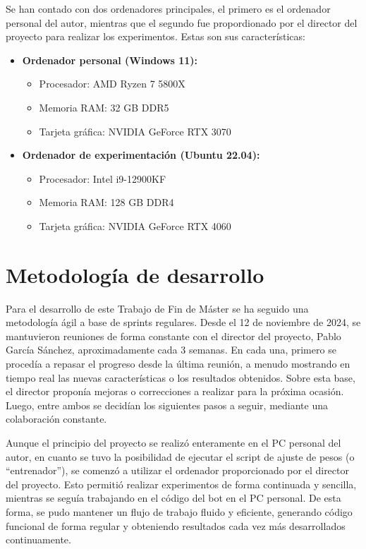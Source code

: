 Se han contado con dos ordenadores principales, el primero es el ordenador personal del autor, mientras que el segundo fue propordionado por el director del proyecto para realizar los experimentos. Estas son sus características:

\begin{itemize}
	\item \textbf{Ordenador personal (Windows 11):}
	      \begin{itemize}
		      \item Procesador: AMD Ryzen 7 5800X
		      \item Memoria RAM: 32 GB DDR5
		      \item Tarjeta gráfica: NVIDIA GeForce RTX 3070
	      \end{itemize}
	\item \textbf{Ordenador de experimentación (Ubuntu 22.04):}
	      \begin{itemize}
		      \item Procesador: Intel i9-12900KF
		      \item Memoria RAM: 128 GB DDR4
		      \item Tarjeta gráfica: NVIDIA GeForce RTX 4060
	      \end{itemize}
\end{itemize}

\section{Metodología de desarrollo} \label{sec:metodologia_desarrollo}

Para el desarrollo de este Trabajo de Fin de Máster se ha seguido una metodología ágil a base de sprints regulares. Desde el 12 de noviembre de 2024, se mantuvieron reuniones de forma constante con el director del proyecto, Pablo García Sánchez, aproximadamente cada 3 semanas. En cada una, primero se procedía a repasar el progreso desde la última reunión, a menudo mostrando en tiempo real las nuevas características o los resultados obtenidos. Sobre esta base, el director proponía mejoras o correcciones a realizar para la próxima ocasión. Luego, entre ambos se decidían los siguientes pasos a seguir, mediante una colaboración constante.

Aunque el principio del proyecto se realizó enteramente en el PC personal del autor, en cuanto se tuvo la posibilidad de ejecutar el script de ajuste de pesos (o ``entrenador''), se comenzó a utilizar el ordenador proporcionado por el director del proyecto. Esto permitió realizar experimentos de forma continuada y sencilla, mientras se seguía trabajando en el código del bot en el PC personal. De esta forma, se pudo mantener un flujo de trabajo fluido y eficiente, generando código funcional de forma regular y obteniendo resultados cada vez más desarrollados continuamente.


